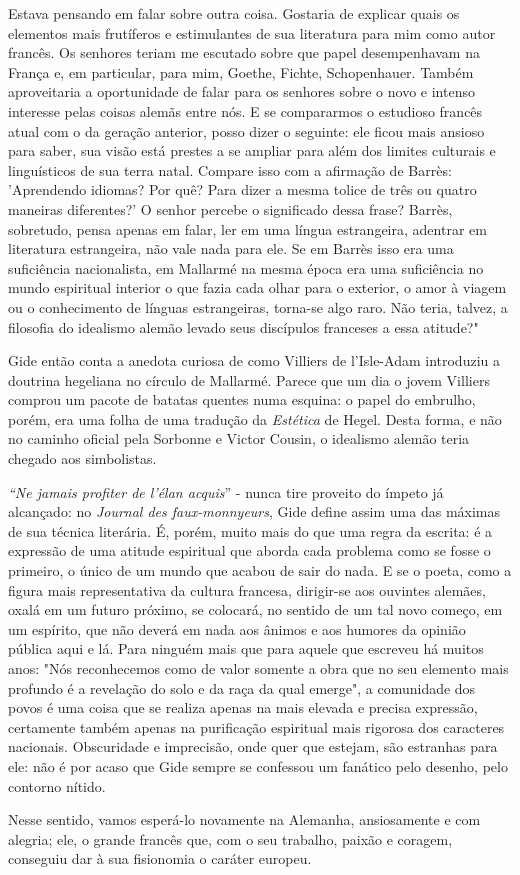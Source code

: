 Estava pensando em falar sobre outra coisa. Gostaria de explicar quais
os elementos mais frutíferos e estimulantes de sua literatura para mim
como autor francês. Os senhores teriam me escutado sobre que papel
desempenhavam na França e, em particular, para mim, Goethe, Fichte,
Schopenhauer. Também aproveitaria a oportunidade de falar para os
senhores sobre o novo e intenso interesse pelas coisas alemãs entre nós.
E se compararmos o estudioso francês atual com o da geração anterior,
posso dizer o seguinte: ele ficou mais ansioso para saber, sua visão
está prestes a se ampliar para além dos limites culturais e linguísticos
de sua terra natal. Compare isso com a afirmação de Barrès: 'Aprendendo
idiomas? Por quê? Para dizer a mesma tolice de três ou quatro maneiras
diferentes?' O senhor percebe o significado dessa frase? Barrès,
sobretudo, pensa apenas em falar, ler em uma língua estrangeira,
adentrar em literatura estrangeira, não vale nada para ele. Se em Barrès
isso era uma suficiência nacionalista, em Mallarmé na mesma época era
uma suficiência no mundo espiritual interior o que fazia cada olhar para
o exterior, o amor à viagem ou o conhecimento de línguas estrangeiras,
torna-se algo raro. Não teria, talvez, a filosofia do idealismo alemão
levado seus discípulos franceses a essa atitude?"

Gide então conta a anedota curiosa de como Villiers de l'Isle-Adam
introduziu a doutrina hegeliana no círculo de Mallarmé. Parece que um
dia o jovem Villiers comprou um pacote de batatas quentes numa esquina:
o papel do embrulho, porém, era uma folha de uma tradução da
\emph{Estética} de Hegel. Desta forma, e não no caminho oficial pela
Sorbonne e Victor Cousin, o idealismo alemão teria chegado aos
simbolistas.

\emph{``Ne jamais profiter de l'élan acquis}'' - nunca tire proveito do
ímpeto já alcançado: no \emph{Journal des faux-monnyeurs}, Gide define
assim uma das máximas de sua técnica literária. É, porém, muito mais do
que uma regra da escrita: é a expressão de uma atitude espiritual que
aborda cada problema como se fosse o primeiro, o único de um mundo que
acabou de sair do nada. E se o poeta, como a figura mais representativa
da cultura francesa, dirigir-se aos ouvintes alemães, oxalá em um futuro
próximo, se colocará, no sentido de um tal novo começo, em um espírito,
que não deverá em nada aos ânimos e aos humores da opinião pública aqui
e lá. Para ninguém mais que para aquele que escreveu há muitos anos:
"Nós reconhecemos como de valor somente a obra que no seu elemento mais
profundo é a revelação do solo e da raça da qual emerge", a comunidade
dos povos é uma coisa que se realiza apenas na mais elevada e precisa
expressão, certamente também apenas na purificação espiritual mais
rigorosa dos caracteres nacionais. Obscuridade e imprecisão, onde quer
que estejam, são estranhas para ele: não é por acaso que Gide sempre se
confessou um fanático pelo desenho, pelo contorno nítido.

Nesse sentido, vamos esperá-lo novamente na Alemanha, ansiosamente e com
alegria; ele, o grande francês que, com o seu trabalho, paixão e
coragem, conseguiu dar à sua fisionomia o caráter europeu.

